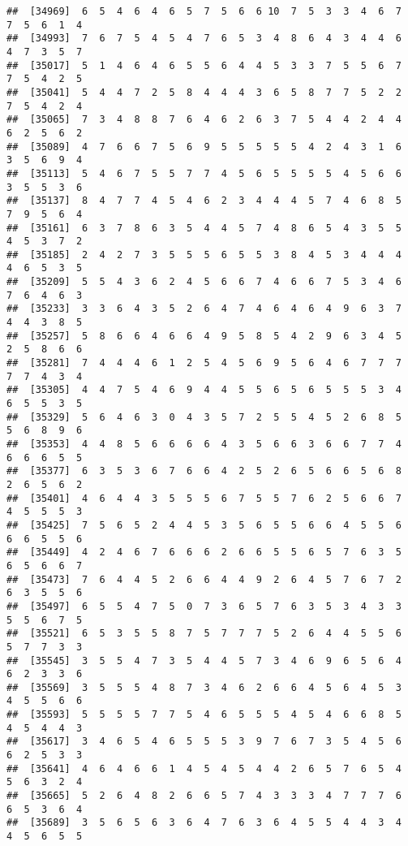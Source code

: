 \documentclass[
]{book}
\begin{document}
\begin{verbatim}
##  [34969]  6  5  4  6  4  6  5  7  5  6  6 10  7  5  3  3  4  6  7  7  5  6  1  4
##  [34993]  7  6  7  5  4  5  4  7  6  5  3  4  8  6  4  3  4  4  6  4  7  3  5  7
##  [35017]  5  1  4  6  4  6  5  5  6  4  4  5  3  3  7  5  5  6  7  7  5  4  2  5
##  [35041]  5  4  4  7  2  5  8  4  4  4  3  6  5  8  7  7  5  2  2  7  5  4  2  4
##  [35065]  7  3  4  8  8  7  6  4  6  2  6  3  7  5  4  4  2  4  4  6  2  5  6  2
##  [35089]  4  7  6  6  7  5  6  9  5  5  5  5  5  4  2  4  3  1  6  3  5  6  9  4
##  [35113]  5  4  6  7  5  5  7  7  4  5  6  5  5  5  5  4  5  6  6  3  5  5  3  6
##  [35137]  8  4  7  7  4  5  4  6  2  3  4  4  4  5  7  4  6  8  5  7  9  5  6  4
##  [35161]  6  3  7  8  6  3  5  4  4  5  7  4  8  6  5  4  3  5  5  4  5  3  7  2
##  [35185]  2  4  2  7  3  5  5  5  6  5  5  3  8  4  5  3  4  4  4  4  6  5  3  5
##  [35209]  5  5  4  3  6  2  4  5  6  6  7  4  6  6  7  5  3  4  6  7  6  4  6  3
##  [35233]  3  3  6  4  3  5  2  6  4  7  4  6  4  6  4  9  6  3  7  4  4  3  8  5
##  [35257]  5  8  6  6  4  6  6  4  9  5  8  5  4  2  9  6  3  4  5  2  5  8  6  6
##  [35281]  7  4  4  4  6  1  2  5  4  5  6  9  5  6  4  6  7  7  7  7  7  4  3  4
##  [35305]  4  4  7  5  4  6  9  4  4  5  5  6  5  6  5  5  5  3  4  6  5  5  3  5
##  [35329]  5  6  4  6  3  0  4  3  5  7  2  5  5  4  5  2  6  8  5  5  6  8  9  6
##  [35353]  4  4  8  5  6  6  6  6  4  3  5  6  6  3  6  6  7  7  4  6  6  6  5  5
##  [35377]  6  3  5  3  6  7  6  6  4  2  5  2  6  5  6  6  5  6  8  2  6  5  6  2
##  [35401]  4  6  4  4  3  5  5  5  6  7  5  5  7  6  2  5  6  6  7  4  5  5  5  3
##  [35425]  7  5  6  5  2  4  4  5  3  5  6  5  5  6  6  4  5  5  6  6  6  5  5  6
##  [35449]  4  2  4  6  7  6  6  6  2  6  6  5  5  6  5  7  6  3  5  6  5  6  6  7
##  [35473]  7  6  4  4  5  2  6  6  4  4  9  2  6  4  5  7  6  7  2  6  3  5  5  6
##  [35497]  6  5  5  4  7  5  0  7  3  6  5  7  6  3  5  3  4  3  3  5  5  6  7  5
##  [35521]  6  5  3  5  5  8  7  5  7  7  7  5  2  6  4  4  5  5  6  5  7  7  3  3
##  [35545]  3  5  5  4  7  3  5  4  4  5  7  3  4  6  9  6  5  6  4  6  2  3  3  6
##  [35569]  3  5  5  5  4  8  7  3  4  6  2  6  6  4  5  6  4  5  3  4  5  5  6  6
##  [35593]  5  5  5  5  7  7  5  4  6  5  5  5  4  5  4  6  6  8  5  4  5  4  4  3
##  [35617]  3  4  6  5  4  6  5  5  5  3  9  7  6  7  3  5  4  5  6  6  2  5  3  3
##  [35641]  4  6  4  6  6  1  4  5  4  5  4  4  2  6  5  7  6  5  4  5  6  3  2  4
##  [35665]  5  2  6  4  8  2  6  6  5  7  4  3  3  3  4  7  7  7  6  6  5  3  6  4
##  [35689]  3  5  6  5  6  3  6  4  7  6  3  6  4  5  5  4  4  3  4  4  5  6  5  5

\end{verbatim}
\end{document}
